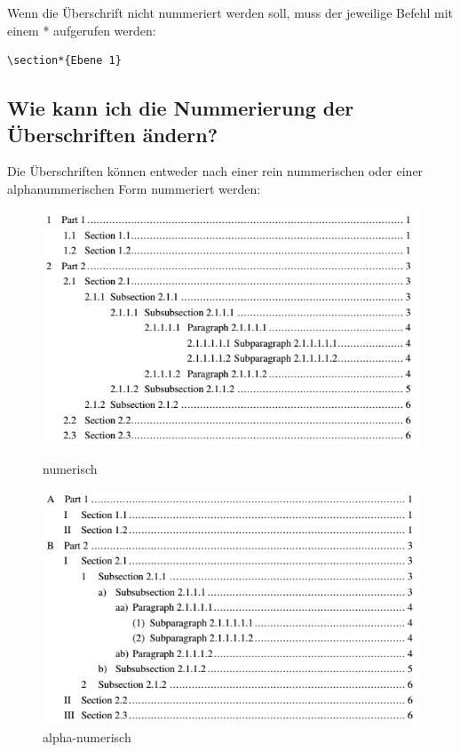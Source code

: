 \documentclass[12pt]{article}
\begin{document}
\noindent Wenn die Überschrift nicht nummeriert werden soll, muss der jeweilige Befehl mit einem * aufgerufen werden:
\begin{verbatim}
\section*{Ebene 1}
\end{verbatim}

\subsection{Wie kann ich die Nummerierung der Überschriften ändern?}
Die Überschriften können entweder nach einer rein nummerischen oder einer alphanummerischen Form nummeriert werden:
\begin{figure}[ht]
    \centering
    \begin{minipage}[t]{0.49\linewidth}
        \centering
        \includegraphics[width=\linewidth]{dokuImages/toc_num.png}
        \caption{numerisch}
    \end{minipage}%
    \hfill
    \begin{minipage}[t]{0.49\linewidth}
        \centering
        \includegraphics[width=\linewidth]{dokuImages/toc_alphanum.png}
        \caption{alpha-numerisch}
    \end{minipage}
\end{figure}
\end{document}
